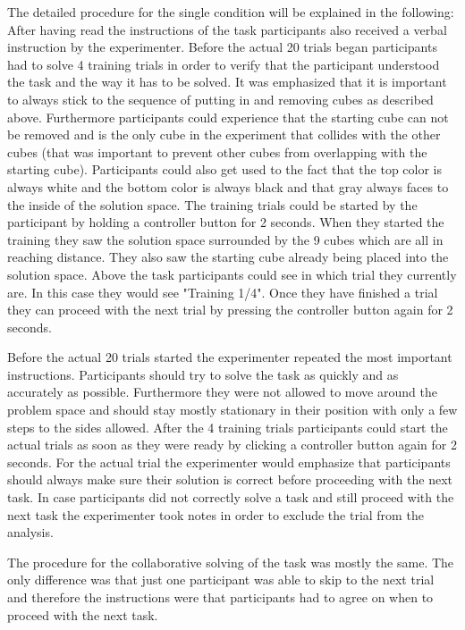 The detailed procedure for the single condition will be explained in the following:
After having read the instructions of the task participants also received a verbal instruction by the experimenter. Before the actual 20 trials began participants had to solve 4 training trials in order to verify that the participant understood the task and the way it has to be solved. It was emphasized that it is important to always stick to the sequence of putting in and removing cubes as described above. Furthermore participants could experience that the starting cube can not be removed and is the only cube in the experiment that collides with the other cubes (that was important to prevent other cubes from overlapping with the starting cube). Participants could also get used to the fact that the top color is always white and the bottom color is always black and that gray always faces to the inside of the solution space. The training trials could be started by the participant by holding a controller button for 2 seconds. When they started the training they saw the solution space surrounded by the 9 cubes which are all in reaching distance. They also saw the starting cube already being placed into the solution space. Above the task participants could see in which trial they currently are. In this case they would see "Training 1/4". Once they have finished a trial they can proceed with the next trial by pressing the controller button again for 2 seconds. 

Before the actual 20 trials started the experimenter repeated the most important instructions. Participants should try to solve the task as quickly and as accurately as possible. Furthermore they were not allowed to move around the problem space and should stay mostly stationary in their position with only a few steps to the sides allowed.
After the 4 training trials participants could start the actual trials as soon as they were ready by clicking a controller button again for 2 seconds. For the actual trial the experimenter would emphasize that participants should always make sure their solution is correct before proceeding with the next task. In case participants did not correctly solve a task and still proceed with the next task the experimenter took notes in order to exclude the trial from the analysis.

The procedure for the collaborative solving of the task was mostly the same. The only difference was that just one participant was able to skip to the next trial and therefore the instructions were that participants had to agree on when to proceed with the next task.


